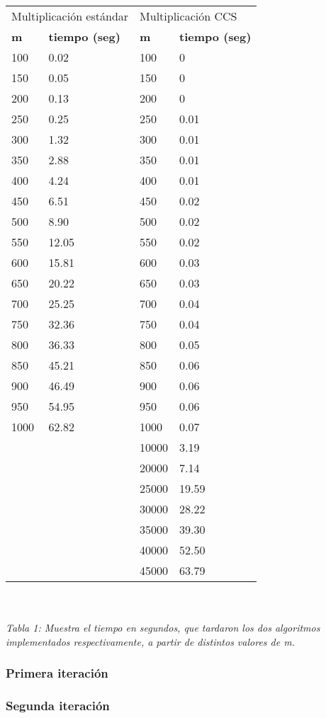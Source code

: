 \documentclass[a4paper,11pt]{article}
\begin{document}
\begin{tabular}{|l||l|l||l|}
\hline
\multicolumn{2}{|l|}{Multiplicaci\'on est\'andar}&\multicolumn{2}{l|}{Multiplicaci\'on CCS}\\
\cline{1-4}
\textbf{m}&\textbf{tiempo (seg)}&\textbf{m}&\textbf{tiempo (seg)}\\
\hline\hline
100 & 0.02 & 100 & 0\\
150 & 0.05 & 150 & 0\\
200 & 0.13 & 200 & 0\\
250 & 0.25 & 250 & 0.01\\
300 & 1.32 & 300 & 0.01\\
350 & 2.88 & 350 & 0.01\\
400 & 4.24 & 400 & 0.01\\
450 & 6.51 & 450 & 0.02\\
500 & 8.90 & 500 & 0.02\\
550 & 12.05 & 550 & 0.02\\
600 & 15.81 & 600 & 0.03\\
650 & 20.22 & 650 & 0.03\\
700 & 25.25 & 700 & 0.04\\
750 & 32.36 & 750 & 0.04\\
800 & 36.33 & 800 & 0.05\\
850 & 45.21 & 850 & 0.06\\
900 & 46.49 & 900 & 0.06\\
950 & 54.95 & 950 & 0.06\\
1000 & 62.82 & 1000 & 0.07\\
 &  & 10000 & 3.19\\
 &  & 20000 & 7.14\\
 &  & 25000 & 19.59\\
 &  & 30000 & 28.22\\
 &  & 35000 & 39.30\\
 &  & 40000 & 52.50\\
 &  & 45000 & 63.79\\
\hline
\end{tabular}\\
\\
\small\emph{Tabla 1: Muestra el tiempo en segundos, que tardaron los dos algoritmos implementados respectivamente, a partir de distintos valores de m.}

\subsubsection{Primera iteraci\'on}
\subsubsection{Segunda iteraci\'on}
\end{document}
